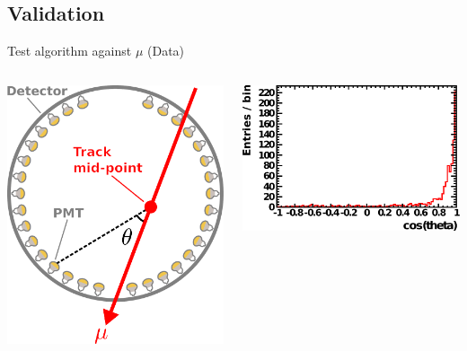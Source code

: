 \documentclass[14pt]{beamer}
\begin{document}
\subsection{Validation}
\begin{frame}{Test algorithm against $\mu$ (Data)}
	\begin{columns}[T]
		\begin{block}{}
			\includegraphics[width=\linewidth]{through_going_muon.pdf}
		\end{block}
		\begin{block}{}
			\includegraphics[width=\linewidth]{analyzed_rtq_run005000_agreementWithMuonFitter_t0Peak_prepulseCut1_0_05maxQThres_1000evts.pdf}
		\end{block}
	\end{columns}
\end{frame}
\end{document}
